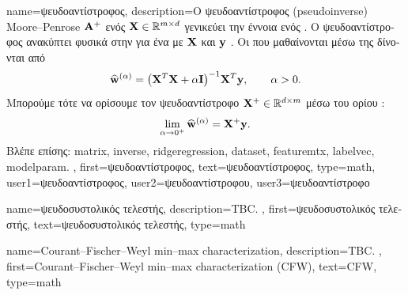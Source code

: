 {name={\foreignlanguage{greek}{ψευδοαντίστροφος}},
	description={\foreignlanguage{greek}{Ο ψευδοαντίστροφος} 
		(pseudoinverse) Moore–Penrose ${\bf A}^{+}$ \foreignlanguage{greek}{ενός}  
		${\bf X} \in \mathbb{R}^{m \times d}$ \foreignlanguage{greek}{γενικεύει την
		έννοια ενός}  \cite{GolubVanLoanBook}. 
		\foreignlanguage{greek}{Ο ψευδοαντίστροφος ανακύπτει φυσικά στην}   
		\foreignlanguage{greek}{για ένα}  \foreignlanguage{greek}{με}  
		${\bf X}$ \foreignlanguage{greek}{και}  ${\bf y}$ 
		\cite[\foreignlanguage{greek}{Κεφ.}\ 3]{hastie01statisticallearning}. 
		\foreignlanguage{greek}{Οι}  \foreignlanguage{greek}{που μαθαίνονται μέσω της} 
		 \foreignlanguage{greek}{δίνονται από}
  		\[
  		\widehat{{\bf w}}^{(\alpha)}  = \big({\bf X}^{T} {\bf X} + \alpha \mathbf{I} \big)^{-1} {\bf X}^{T} {\bf y}, \qquad \alpha > 0.
  		\]
  		\foreignlanguage{greek}{Μπορούμε τότε να ορίσουμε τον ψευδοαντίστροφο 
		${\bf X}^{+} \in \mathbb{R}^{d \times m}$ μέσω του ορίου} 
		\cite[\foreignlanguage{greek}{Κεφ.} 3]{benisrael2003generalized}:
  		\[
  		\lim_{\alpha \to 0^+} \widehat{{\bf w}}^{(\alpha)} = {\bf X}^+ {\bf y}.
  		\]
		\foreignlanguage{greek}{Βλέπε επίσης:} \gls{matrix}, \gls{inverse}, \gls{ridgeregression}, \gls{dataset}, \gls{featuremtx}, 
		\gls{labelvec}, \gls{modelparam}. },
 	first={\foreignlanguage{greek}{ψευδοαντίστροφος}},
 	text={\foreignlanguage{greek}{ψευδοαντίστροφος}},
	type=math,
	user1={\foreignlanguage{greek}{ψευδοαντίστροφος}}, %
    	user2={\foreignlanguage{greek}{ψευδοαντίστροφου}}, %
	user3={\foreignlanguage{greek}{ψευδοαντίστροφο}} %
}

{name={\foreignlanguage{greek}{ψευδοσυστολικός τελεστής}},
	description={TBC. },
	first={\foreignlanguage{greek}{ψευδοσυστολικός τελεστής}},
	text={\foreignlanguage{greek}{ψευδοσυστολικός τελεστής}},
	type=math
}

{name={Courant–Fischer–Weyl min–max characterization}, 
	description={TBC. }, 
	first={Courant–Fischer–Weyl min–max characterization (CFW)},
	text={CFW},
	type=math
}

